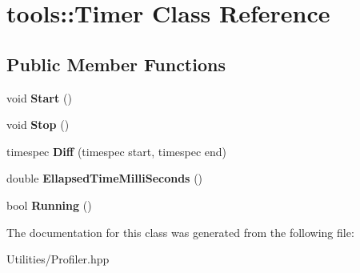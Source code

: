 \hypertarget{classtools_1_1_timer}{\section{tools\+:\+:Timer Class Reference}
\label{classtools_1_1_timer}
}
\subsection*{Public Member Functions}
\begin{DoxyCompactItemize}
\item 
\hypertarget{classtools_1_1_timer_af4c15c839d48c6c55dae51329de27951}{void {\bfseries Start} ()}\label{classtools_1_1_timer_af4c15c839d48c6c55dae51329de27951}

\item 
\hypertarget{classtools_1_1_timer_afc182432a3518999df1b1f0b7295d0f5}{void {\bfseries Stop} ()}\label{classtools_1_1_timer_afc182432a3518999df1b1f0b7295d0f5}

\item 
\hypertarget{classtools_1_1_timer_a60069d5e2c82a41779c503b0886bba9d}{timespec {\bfseries Diff} (timespec start, timespec end)}\label{classtools_1_1_timer_a60069d5e2c82a41779c503b0886bba9d}

\item 
\hypertarget{classtools_1_1_timer_a0cfb8ea4a8e311b6d8999fc813cf9717}{double {\bfseries Ellapsed\+Time\+Milli\+Seconds} ()}\label{classtools_1_1_timer_a0cfb8ea4a8e311b6d8999fc813cf9717}

\item 
\hypertarget{classtools_1_1_timer_a8ddd66a28932f1fd8002bd24acfcec7d}{bool {\bfseries Running} ()}\label{classtools_1_1_timer_a8ddd66a28932f1fd8002bd24acfcec7d}

\end{DoxyCompactItemize}


The documentation for this class was generated from the following file\+:\begin{DoxyCompactItemize}
\item 
Utilities/Profiler.\+hpp\end{DoxyCompactItemize}
